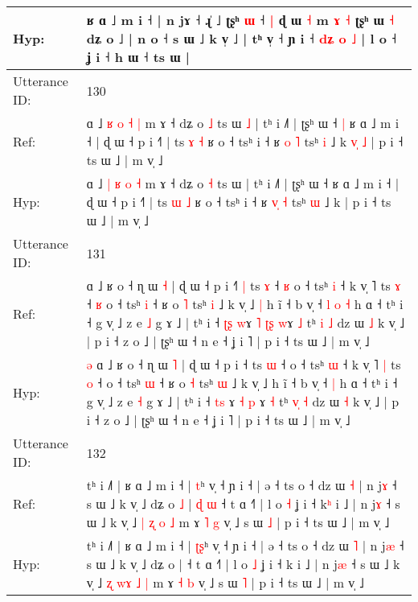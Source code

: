 \documentclass[10pt]{article}
\DeclareRobustCommand{\hl}[1]{{\textcolor{red}{#1}}}
\begin{document}
\begin{longtable}{ll}
 \\
Hyp: & ʁ ɑ ˩ m i ˧ | n jɤ ˧\hl{}\hl{} ɻ̍ ˩ ʈʂʰ \hl{ɯ} ˧\hl{ }\hl{|} ɖ ɯ \hl{˧} m \hl{ɤ} \hl{˧} ʈʂʰ ɯ \hl{˧} dʑ o ˩ | n o ˧ s ɯ ˩ k v̩ ˩ | tʰ v̩ ˧ ɲ i ˧\hl{ }\hl{d}\hl{ʑ}\hl{ }\hl{o}\hl{ }\hl{˩} | l o ˧ ʝ i ˧ h ɯ ˧ ts ɯ\hl{}\hl{} |
 \\
\midrule
Utterance ID: & 130 \\
Ref: & ɑ ˩ \hl{ʁ} \hl{o} \hl{˧} \hl{|} m ɤ ˧ dʑ o \hl{˩} ts ɯ\hl{ }\hl{˩} | tʰ i ˩˥ | ʈʂʰ ɯ ˧\hl{ }\hl{|} ʁ ɑ ˩ m i ˧ | ɖ ɯ ˧ p i ˧˥ | ts \hl{ɤ} \hl{˧} ʁ o ˧ tsʰ i ˧ ʁ \hl{}\hl{o} \hl{˥} tsʰ \hl{i} ˩ k\hl{ }\hl{v}\hl{̩}\hl{ }\hl{˩} | p i ˧ ts ɯ ˩ | m v̩ ˩
 \\
Hyp: & ɑ ˩ \hl{|} \hl{ʁ} \hl{o} \hl{˧} m ɤ ˧ dʑ o \hl{˧} ts ɯ\hl{}\hl{} | tʰ i ˩˥ | ʈʂʰ ɯ ˧\hl{}\hl{} ʁ ɑ ˩ m i ˧ | ɖ ɯ ˧ p i ˧˥ | ts \hl{ɯ} \hl{˩} ʁ o ˧ tsʰ i ˧ ʁ \hl{v}\hl{̩} \hl{˧} tsʰ \hl{ɯ} ˩ k\hl{}\hl{}\hl{}\hl{}\hl{} | p i ˧ ts ɯ ˩ | m v̩ ˩
 \\
\midrule
Utterance ID: & 131 \\
Ref: & \hl{}\hl{}ɑ ˩ ʁ o ˧ ɳ ɯ \hl{˧} | ɖ ɯ ˧ p i ˧\hl{˥}\hl{ }\hl{|} ts \hl{ɤ} ˧\hl{ }\hl{ʁ} o ˧ tsʰ \hl{i} ˧ k v̩ ˥\hl{}\hl{} ts \hl{ɤ} ˧\hl{ }\hl{ʁ} o ˧ tsʰ \hl{i} ˧ ʁ o \hl{˥} tsʰ \hl{i} ˩ k v̩ ˩\hl{ }\hl{|} h ĩ ˧ b v̩ ˧\hl{ }\hl{l}\hl{ }\hl{o} \hl{˧} h ɑ ˧ tʰ i ˧ g v̩ ˩ z e \hl{˩} g ɤ ˩ | tʰ i ˧ \hl{ʈ}\hl{ʂ} \hl{w}ɤ \hl{˥} \hl{ʈ}\hl{ʂ} \hl{w}ɤ \hl{˩} tʰ \hl{}\hl{i} \hl{˩} dz ɯ \hl{˩} k v̩ ˩ | p i ˧ z o ˩ | ʈʂʰ ɯ ˧ n e ˧ ʝ i ˥ | p i ˧ ts ɯ ˩ | m v̩ ˩
 \\
Hyp: & \hl{ə}\hl{ }ɑ ˩ ʁ o ˧ ɳ ɯ \hl{˥} | ɖ ɯ ˧ p i ˧\hl{}\hl{}\hl{} ts \hl{ɯ} ˧\hl{}\hl{} o ˧ tsʰ \hl{ɯ} ˧ k v̩ ˥\hl{ }\hl{|} ts \hl{o} ˧\hl{}\hl{} o ˧ tsʰ \hl{ɯ} ˧ ʁ o \hl{˧} tsʰ \hl{ɯ} ˩ k v̩ ˩\hl{}\hl{} h ĩ ˧ b v̩ ˧\hl{}\hl{}\hl{}\hl{} \hl{|} h ɑ ˧ tʰ i ˧ g v̩ ˩ z e \hl{˧} g ɤ ˩ | tʰ i ˧ \hl{t}\hl{s} \hl{}ɤ \hl{˧} \hl{}\hl{p} \hl{}ɤ \hl{˧} tʰ \hl{v}\hl{̩} \hl{˧} dz ɯ \hl{˧} k v̩ ˩ | p i ˧ z o ˩ | ʈʂʰ ɯ ˧ n e ˧ ʝ i ˥ | p i ˧ ts ɯ ˩ | m v̩ ˩
 \\
\midrule
Utterance ID: & 132 \\
Ref: & tʰ i ˩˥ | ʁ ɑ ˩ m i ˧ | \hl{}\hl{t}ʰ v̩ ˧ ɲ i ˧ | ə ˧ ts o ˧ dz ɯ \hl{˧} | n j\hl{ɤ} ˧ s ɯ ˩ k v̩ ˩ dʑ o\hl{ }\hl{˩} |\hl{ }\hl{ɖ}\hl{ }\hl{ɯ} ˧ t ɑ ˧˥ | l o \hl{˧} ʝ i ˧ k\hl{ʰ} i ˩ | n j\hl{ɤ} ˧ s ɯ ˩ k v̩ ˩ \hl{|} \hl{}\hl{ʐ} \hl{o} \hl{˩} m ɤ \hl{˥} \hl{g} v̩ ˩ s ɯ \hl{˩} | p i ˧ ts ɯ ˩ | m v̩ ˩
 \\
Hyp: & tʰ i ˩˥ | ʁ ɑ ˩ m i ˧ | \hl{ʈ}\hl{ʂ}ʰ v̩ ˧ ɲ i ˧ | ə ˧ ts o ˧ dz ɯ \hl{˥} | n j\hl{æ} ˧ s ɯ ˩ k v̩ ˩ dʑ o\hl{}\hl{} |\hl{}\hl{}\hl{}\hl{} ˧ t ɑ ˧˥ | l o \hl{˩} ʝ i ˧ k\hl{} i ˩ | n j\hl{æ} ˧ s ɯ ˩ k v̩ ˩ \hl{ʐ} \hl{w}\hl{ɤ} \hl{˩} \hl{|} m ɤ \hl{˧} \hl{b} v̩ ˩ s ɯ \hl{˥} | p i ˧ ts ɯ ˩ | m v̩ ˩

\end{longtable}
\end{document}
